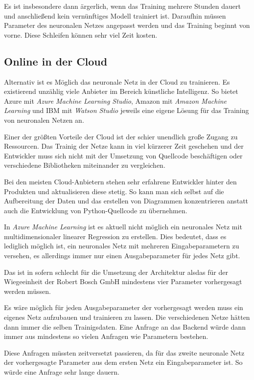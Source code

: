 Es ist insbesondere dann ärgerlich, wenn das Training mehrere Stunden dauert und anschließend kein vernünftiges Modell
trainiert ist. Daraufhin müssen Parameter des neuronalen Netzes angepasst werden und das Training beginnt von vorne.
Diese Schleifen können sehr viel Zeit kosten.

\subsection{Online in der Cloud}
Alternativ ist es Möglich das neuronale Netz in der Cloud zu trainieren. Es existierend unzählig viele Anbieter im
Bereich künstliche Intelligenz. So bietet Azure mit \textit{Azure Machine Learning Studio}, Amazon mit
\textit{Amazon Machine Learning} und IBM mit \textit{Watson Studio} jeweils eine eigene Lösung für das Training von
neuronalen Netzen an.

Einer der größten Vorteile der Cloud ist der schier unendlich große Zugang zu Ressourcen. Das Trainig der Netze kann in
viel kürzerer Zeit geschehen und der Entwickler muss sich nicht mit der Umsetzung von Quellcode beschäftigen oder
verschiedene Bibliotheken miteinander zu vergleichen.

Bei den meisten Cloud-Anbietern stehen sehr erfahrene Entwickler hinter den Produkten und aktualisieren diese stetig. So
kann man sich selbst auf die Aufbereitung der Daten und das erstellen von Diagrammen konzentrieren anstatt auch die
Entwicklung von Python-Quellcode zu übernehmen.

In \textit{Azure Machine Learning} ist es aktuell nicht möglich ein neuronales Netz mit multidimensionaler linearer
Regression zu erstellen. Dies bedeutet, dass es lediglich möglich ist, ein neuronales Netz mit mehreren
Eingabeparametern zu versehen, es allerdings immer nur einen Ausgabeparameter für jedes Netz gibt.

Das ist in sofern schlecht für die Umsetzung der Architektur alsdas für der Wiegeeinheit der Robert Bosch GmbH
mindestens vier Parameter vorhergesagt werden müssen.

Es wäre möglich für jeden Ausgabeparameter der vorhergesagt werden muss ein eigenes Netz aufzubauen und trainieren zu
lassen. Die verschiedenen Netze hätten dann immer die selben Trainigsdaten. Eine Anfrage an das Backend würde dann immer
aus mindestens so vielen Anfragen wie Parametern bestehen.

Diese Anfragen müssten zeitversetzt passieren, da für das zweite neuronale Netz der vorhergesagte Parameter aus dem
ersten Netz ein Eingabeparameter ist. So würde eine Anfrage sehr lange dauern.

